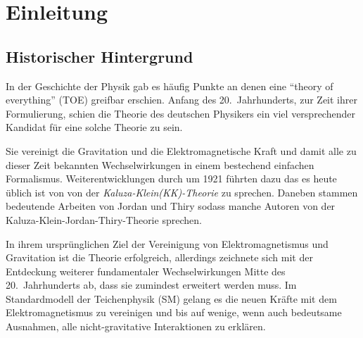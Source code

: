 \chapter{Einleitung}
\section{Historischer Hintergrund}
In der Geschichte der Physik gab es häufig Punkte an denen eine \enquote{theory
of everything} (TOE) greifbar erschien. Anfang des 20.\ Jahrhunderts, zur
Zeit ihrer Formulierung, schien die Theorie des deutschen Physikers  
ein viel versprechender Kandidat für eine solche Theorie zu sein.

Sie vereinigt die Gravitation und die Elektromagnetische Kraft und damit alle zu
dieser Zeit bekannten Wechselwirkungen in einem bestechend einfachen
Formalismus. Weiterentwicklungen durch  um 1921 führten dazu
das es heute üblich ist von von der \emph{Kaluza-Klein(KK)-Theorie} zu sprechen.
Daneben stammen bedeutende Arbeiten von Jordan und Thiry sodass manche Autoren
von der Kaluza-Klein-Jordan-Thiry-Theorie sprechen.

In ihrem ursprünglichen Ziel der Vereinigung von Elektromagnetismus und
Gravitation ist die Theorie erfolgreich, 
allerdings zeichnete sich mit der Entdeckung weiterer
fundamentaler Wechselwirkungen Mitte des 20.\ Jahrhunderts ab, dass 
sie zumindest erweitert werden muss.
Im Standardmodell der Teichenphysik (SM) gelang es die neuen Kräfte mit dem
Elektromagnetismus zu vereinigen und bis auf wenige, wenn auch
bedeutsame Ausnahmen, alle nicht-gravitative Interaktionen zu erklären. 

